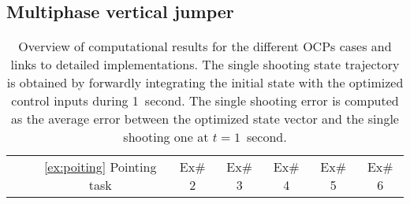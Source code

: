 \subsection{Multiphase vertical jumper}\label{ex:jump}

%
\begin{table*}[h!]
\caption{\small Overview of computational results for the different OCPs cases and links to detailed implementations. The single shooting state trajectory is obtained by forwardly integrating the initial state with the optimized control inputs during 1~second. The single shooting error is computed as the average error between the optimized state vector and the single shooting one at $t=1$~second.}
\label{tab:Perfs_and_detailed_implementations_of_each_example}
\centering
\begin{tabular}{c l rcl rcl rcl rcl rcl rcl}
\cmidrule[\heavyrulewidth](lr){2-20}
& & \multicolumn{3}{c}{\ref{ex:poiting} Pointing task} & \multicolumn{3}{c}{Ex\# 2} & \multicolumn{3}{c}{Ex\# 3} & \multicolumn{3}{c}{Ex\# 4} & \multicolumn{3}{c}{Ex\# 5} & \multicolumn{3}{c}{Ex\# 6}\\
\cmidrule[\heavyrulewidth](lr){3-5}
\cmidrule[\heavyrulewidth](lr){6-8}
\cmidrule[\heavyrulewidth](lr){9-11}
\cmidrule[\heavyrulewidth](lr){12-14}
\cmidrule[\heavyrulewidth](lr){15-17}
\cmidrule[\heavyrulewidth](lr){18-20}


\end{tabular}
\end{table*}
